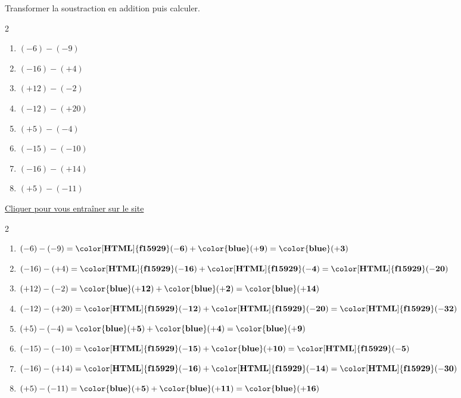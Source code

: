 \begin{exercice*}
    Transformer la soustraction en addition puis calculer.
    \begin{multicols}2
        \begin{enumerate}            
            \item $ (-6) - (-9) $
            \item $ (-16) - (+4) $
            \item $ (+12) - (-2) $
            \item $ (-12) - (+20) $
            \item $ (+5) - (-4) $
            \item $ (-15) - (-10) $
            \item $ (-16) - (+14) $
            \item $ (+5) - (-11) $
        \end{enumerate}
    \end{multicols}

    \href{https://coopmaths.fr/mathalea.html?ex=5R21,s=20,s2=false,n=10,cd=1,i=1&v=l&z=1}{Cliquer pour vous entraîner sur le site \mathaleaLogo} 
\end{exercice*}
\begin{corrige}
    \phantom{rrr}    
    \begin{multicols}2
        \begin{enumerate}
            \item $ (-6) - (-9) = \mathbf{{\color[HTML]{f15929}(-6)}} + \mathbf{{\color{blue}(+9)}} = \mathbf{{\color{blue}(+3)}} $
            \item $ (-16) - (+4) = \mathbf{{\color[HTML]{f15929}(-16)}} + \mathbf{{\color[HTML]{f15929}(-4)}} = \mathbf{{\color[HTML]{f15929}(-20)}} $
            \item $ (+12) - (-2) = \mathbf{{\color{blue}(+12)}} + \mathbf{{\color{blue}(+2)}} = \mathbf{{\color{blue}(+14)}} $
            \item $ (-12) - (+20) = \mathbf{{\color[HTML]{f15929}(-12)}} + \mathbf{{\color[HTML]{f15929}(-20)}} = \mathbf{{\color[HTML]{f15929}(-32)}} $
            \item $ (+5) - (-4) = \mathbf{{\color{blue}(+5)}} + \mathbf{{\color{blue}(+4)}} = \mathbf{{\color{blue}(+9)}} $
            \item $ (-15) - (-10) = \mathbf{{\color[HTML]{f15929}(-15)}} + \mathbf{{\color{blue}(+10)}} = \mathbf{{\color[HTML]{f15929}(-5)}} $
            \item $ (-16) - (+14) = \mathbf{{\color[HTML]{f15929}(-16)}} + \mathbf{{\color[HTML]{f15929}(-14)}} = \mathbf{{\color[HTML]{f15929}(-30)}} $
            \item $ (+5) - (-11) = \mathbf{{\color{blue}(+5)}} + \mathbf{{\color{blue}(+11)}} = \mathbf{{\color{blue}(+16)}} $
        \end{enumerate}
    \end{multicols}
\end{corrige}